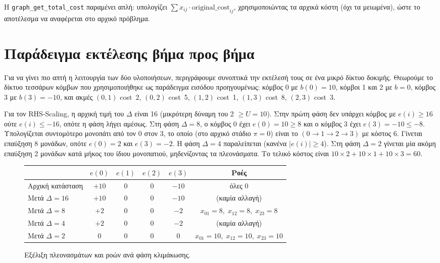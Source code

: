 \documentclass[11pt,a4paper,oneside]{report}
\begin{document}
Η \texttt{graph\_get\_total\_cost} παραμένει απλή: υπολογίζει $\sum x_{ij} \cdot \text{original\_cost}_{ij}$, χρησιμοποιώντας τα αρχικά κόστη (όχι τα μειωμένα), ώστε το αποτέλεσμα να αναφέρεται στο αρχικό πρόβλημα.

\section{Παράδειγμα εκτέλεσης βήμα προς βήμα}

Για να γίνει πιο απτή η λειτουργία των δύο υλοποιήσεων, περιγράφουμε συνοπτικά την εκτέλεσή τους σε ένα μικρό δίκτυο δοκιμής. Θεωρούμε το δίκτυο τεσσάρων κόμβων που χρησιμοποιήθηκε ως παράδειγμα εισόδου προηγουμένως: κόμβος 0 με $b(0) = 10$, κόμβοι 1 και 2 με $b = 0$, κόμβος 3 με $b(3) = -10$, και ακμές $(0,1)$ cost~2, $(0,2)$ cost~5, $(1,2)$ cost~1, $(1,3)$ cost~8, $(2,3)$ cost~3.

Για τον \textenglish{RHS-Scaling}, η αρχική τιμή του $\Delta$ είναι 16 (μικρότερη δύναμη του 2 $\geq U = 10$). Στην πρώτη φάση δεν υπάρχει κόμβος με $e(i) \geq 16$ ούτε $e(i) \leq -16$, οπότε η φάση λήγει αμέσως. Στη φάση $\Delta = 8$, ο κόμβος 0 έχει $e(0) = 10 \geq 8$ και ο κόμβος 3 έχει $e(3) = -10 \leq -8$. Υπολογίζεται συντομότερο μονοπάτι από τον 0 στον 3, το οποίο (στο αρχικό στάδιο $\pi = 0$) είναι το $(0 \to 1 \to 2 \to 3)$ με κόστος 6. Γίνεται επαύξηση 8 μονάδων, οπότε $e(0) = 2$ και $e(3) = -2$. Η φάση $\Delta = 4$ παραλείπεται (κανένα $|e(i)| \geq 4$). Στη φάση $\Delta = 2$ γίνεται μία ακόμη επαύξηση 2 μονάδων κατά μήκος του ίδιου μονοπατιού, μηδενίζοντας τα πλεονάσματα. Το τελικό κόστος είναι $10 \times 2 + 10 \times 1 + 10 \times 3 = 60$.

\begin{figure}[h]
\centering
\begin{tabular}{lccccc}
\toprule
& $e(0)$ & $e(1)$ & $e(2)$ & $e(3)$ & Ροές \\
\midrule
Αρχική κατάσταση & $+10$ & $0$ & $0$ & $-10$ & όλες $0$ \\
Μετά $\Delta = 16$ & $+10$ & $0$ & $0$ & $-10$ & (καμία αλλαγή) \\
Μετά $\Delta = 8$ & $+2$ & $0$ & $0$ & $-2$ & $x_{01}{=}8,\; x_{12}{=}8,\; x_{23}{=}8$ \\
Μετά $\Delta = 4$ & $+2$ & $0$ & $0$ & $-2$ & (καμία αλλαγή) \\
Μετά $\Delta = 2$ & $0$ & $0$ & $0$ & $0$ & $x_{01}{=}10,\; x_{12}{=}10,\; x_{23}{=}10$ \\
\bottomrule
\end{tabular}
\caption{Εξέλιξη πλεονασμάτων και ροών ανά φάση κλιμάκωσης.}
\label{fig:phases}
\end{figure}
\end{document}
